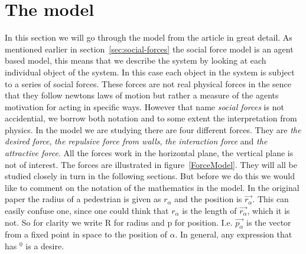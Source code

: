 \section{The model}
\label{sec:the-model}
In this section we will go through the model from the article \cite{self-org} 
in great detail. As mentioned earlier in section~\ref{sec:social-forces} the 
social force model is an agent based model, this means that we describe the 
system by looking at each individual object of the system. In this case each 
object in the system is subject to a series of social forces. These forces 
are not real physical forces in the sence that they follow newtons laws of 
motion but rather a measure of the agents motivation for acting in specific 
ways. However that name \emph{social forces} is not accidential, we borrow 
both notation and to some extent the interpretation from physics. In the model 
we are studying there are four different forces. They are \emph{the desired force}, 
\emph{the repulsive force from walls}, \emph{the interaction force} and \emph{the 
attractive force}. All the forces work in the horizontal plane, the vertical 
plane is not of interest. The forces are illustrated in 
figure~\ref{ForceModel}.  They will all be studied closely in turn in the 
following sections.  But before we do this we would like to comment on the 
notation of the mathematics in the model. In the original paper the radius of 
a pedestrian is given as $r_{\alpha}$ and the position is $\vec{r_{\alpha}}$. 
This can easily confuse one, since one could think that $r_{\alpha}$ is the length 
of $\vec{r_{\alpha}}$, which it is not. So for clarity we write R for radius and p for position. I.e. $\overrightarrow{p_{\alpha}}$ is the vector from a fixed point in space to the position of $\alpha$. In general, any expression that 
has $^{0}$ is a desire. 

